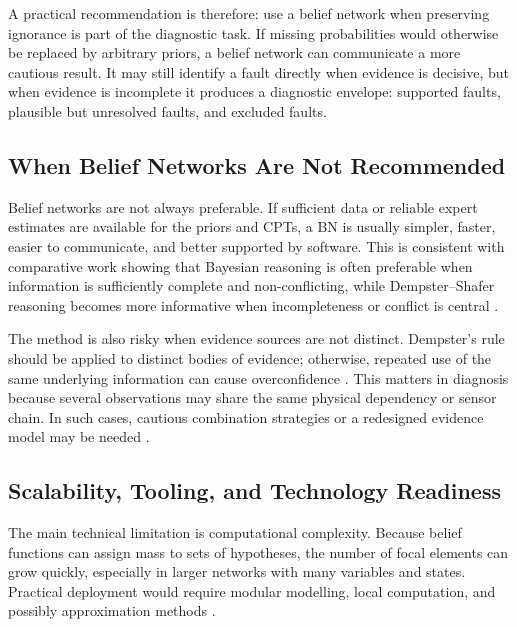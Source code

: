 \documentclass[runningheads]{llncs}
\begin{document}
A practical recommendation is therefore: use a belief network when preserving ignorance is part of the diagnostic task. If missing probabilities would otherwise be replaced by arbitrary priors, a belief network can communicate a more cautious result. It may still identify a fault directly when evidence is decisive, but when evidence is incomplete it produces a diagnostic envelope: supported faults, plausible but unresolved faults, and excluded faults.

\subsection{When Belief Networks Are Not Recommended}
\label{sec:when_not_recommended}

Belief networks are not always preferable. If sufficient data or reliable expert estimates are available for the priors and CPTs, a BN is usually simpler, faster, easier to communicate, and better supported by software. This is consistent with comparative work showing that Bayesian reasoning is often preferable when information is sufficiently complete and non-conflicting, while Dempster--Shafer reasoning becomes more informative when incompleteness or conflict is central \cite{VerbertBabuskaDeSchutter2017}.

The method is also risky when evidence sources are not distinct. Dempster's rule should be applied to distinct bodies of evidence; otherwise, repeated use of the same underlying information can cause overconfidence \cite{Shenoy2023DistinctBeliefFunctions}. This matters in diagnosis because several observations may share the same physical dependency or sensor chain. In such cases, cautious combination strategies or a redesigned evidence model may be needed \cite{Denoeux2008}.

\subsection{Scalability, Tooling, and Technology Readiness}
\label{sec:scalability_tooling_readiness}

The main technical limitation is computational complexity. Because belief functions can assign mass to sets of hypotheses, the number of focal elements can grow quickly, especially in larger networks with many variables and states. Practical deployment would require modular modelling, local computation, and possibly approximation methods \cite{ShaferShenoyMellouli1987,Shenoy2023IncompleteBN}.
\end{document}
